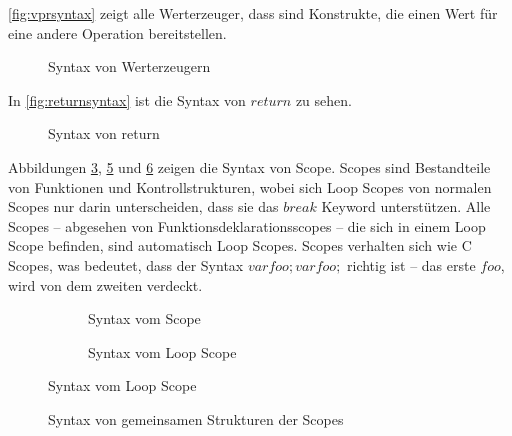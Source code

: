 {      \autoref{fig:vprsyntax} zeigt alle Werterzeuger, dass sind Konstrukte, die einen Wert für eine andere Operation bereitstellen.
      \begin{figure}[H]
        \centering
        \caption{Syntax von Werterzeugern}
        \label{fig:vprsyntax}
      \end{figure}

      In \autoref{fig:returnsyntax} ist die Syntax von \myMIn$return$ zu sehen.
      \begin{figure}[H]
        \centering
        \caption{Syntax von return}
        \label{fig:returnsyntax}
      \end{figure}

      Abbildungen \ref{fig:scopesyntax}, \ref{fig:loopscopesyntax} und \ref{fig:commonsyntax} zeigen die Syntax von Scope. Scopes sind Bestandteile von Funktionen und Kontrollstrukturen, wobei sich Loop Scopes von normalen Scopes nur darin unterscheiden, dass sie das \myMIn$break$ Keyword unterstützen. Alle Scopes -- abgesehen von Funktionsdeklarationsscopes -- die sich in einem Loop Scope befinden, sind automatisch Loop Scopes. Scopes verhalten sich wie C Scopes, was bedeutet, dass der Syntax \myMIn$var foo; {var foo;}$ richtig ist -- das erste \myMIn$foo$, wird von dem zweiten verdeckt.
      \begin{figure}[H]
        \centering
        \begin{minipage}{.45\linewidth}
          \vspace*{2.45em}
          \begin{figure}[H]
            \centering
            \caption{Syntax vom Scope}
            \label{fig:scopesyntax}
          \end{figure}
        \end{minipage}%
        \begin{minipage}{.45\linewidth}
          \begin{figure}[H]
            \centering
            \caption{Syntax vom Loop Scope}
            \label{fig:loopscopesyntax}
          \end{figure}
        \end{minipage}
      \end{figure}

      \begin{figure}[H]
        \centering
        \caption{Syntax von gemeinsamen Strukturen der Scopes}
        \label{fig:commonsyntax}
      \end{figure}

}

